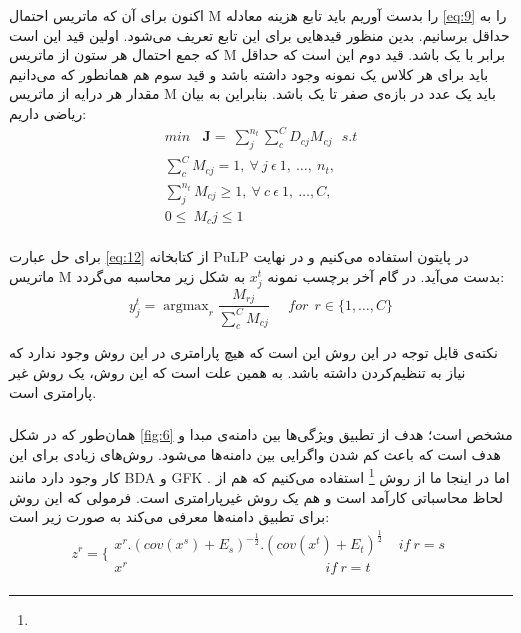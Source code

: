 {{{			اکنون برای آن که ماتریس احتمال M را بدست آوریم باید تابع هزینه معادله
			\ref{eq:9}
			را به حداقل برسانیم. بدین منظور قیدهایی برای این تابع تعریف می‌شود. اولین قید این است که جمع احتمال هر ستون از ماتریس M برابر با یک باشد. قید دوم این است که حداقل باید برای هر کلاس یک نمونه وجود داشته باشد و قید سوم هم همانطور که می‌دانیم مقدار هر درایه از ماتریس M باید یک عدد در بازه‌ی صفر تا یک باشد. بنابراین به بیان ریاضی داریم:
			\begin{equation}
			\begin{aligned}
			min\ \ \ \ \mathbf{J}=\ \sum_{j}^{n_t}\sum_{c}^{C}{D_{cj}}M_{cj} \ \ \ s.t \\ 
			\sum_{c}^{C}M_{cj}=1,\ \forall\ j\ \epsilon\ 1,\ \ldots,\ n_t, \ \ \ \  \\ 
			\sum_{j}^{n_t}M_{cj}\geq1,\ \forall\ c\ \epsilon\ 1,\ \ldots,C,  \ \ \ \ \ \\ 
			0\le\ M_cj\le1\ \ \ \ \ \ \ \ \ \ \ \ \ \ \ \ \ \ \ \ \ \ \ \ \ \ \ \  \\
			\end{aligned}
			\label{eq:12}
			\end{equation}
			
			برای حل عبارت 
			\ref{eq:12}
			از کتابخانه PuLP در پایتون استفاده می‌کنیم و در نهایت ماتریس M بدست می‌آید. در گام آخر برچسب نمونه
			$x_j^t$
			به شکل زیر محاسبه می‌گردد:
			\begin{equation}
			y_{j}^{t}=\mathop{argmax}_{r}\frac{M_{rj}}{ \sum _{c}^{C}M_{cj}}\ \ \ \ \ \ for \ \ r \in  \{ 1,  \ldots , C \}
			\label{eq:13}
			\end{equation}
			
			نکته‌ی قابل توجه در این روش این است که هیچ پارامتری در این روش وجود ندارد که نیاز به تنظیم‌کردن داشته باشد. به همین علت است که این روش، یک روش غیر پارامتری است.
		}
		
		\subsubsection{}
		{
			همان‌طور که در شکل 
			\ref{fig:6}
			مشخص است؛ هدف از 
			تطبیق ویژگی‌ها بین دامنه‌ی مبدا و هدف است که باعث کم شدن واگرایی بین دامنه‌ها می‌شود. روش‌های زیادی برای این کار وجود دارد مانند BDA‌ و GFK . اما در اینجا ما از روش 
			\footnote{}
			استفاده می‌کنیم که هم از لحاظ محاسباتی کارآمد است و هم یک روش غیرپارامتری است. فرمولی که این روش برای تطبیق دامنه‌ها معرفی می‌کند به صورت زیر است:
			\begin{equation}
				z^{r}= \bigg\{ \begin{array}{c}
				x^{r}.  \left( cov \left( x^{s} \right) +E_{s} \right) ^{-\frac{1}{2}}. \left( cov \left( x^{t} \right) +E_{t} \right) ^{\frac{1}{2}}\ \ \ \ \ if \ r=s\\
				x^{r} \ \ \ \ \ \ \ \ \ \ \ \ \ \ \ \ \ \ \ \ \ \ \ \ \ \ \ \ \ \ \ \ \ \ \ \ \ \ \ \ \ \ \ \ \ \ \ \ \ \ \ \ \ \ \ \ \ \ \ \ \ \ \ \   if \ r=t\\
				\end{array}
				\label{eq:14}
			\end{equation}
			
}}}
